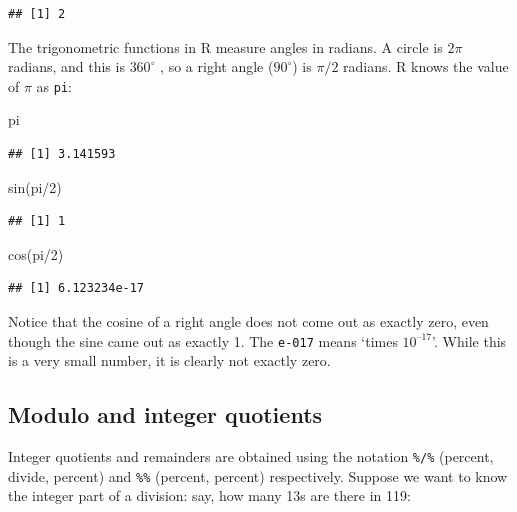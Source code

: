 \documentclass[
]{book}
\newenvironment{Shaded}{\begin{snugshade}}{\end{snugshade}}
\newcommand{\DecValTok}[1]{\textcolor[rgb]{0.00,0.00,0.81}{#1}}
\newcommand{\FunctionTok}[1]{\textcolor[rgb]{0.00,0.00,0.00}{#1}}
\newcommand{\NormalTok}[1]{#1}
\newcommand{\SpecialCharTok}[1]{\textcolor[rgb]{0.00,0.00,0.00}{#1}}
\begin{document}
\begin{verbatim}
## [1] 2
\end{verbatim}

The trigonometric functions in R measure angles in radians. A circle is \(2\pi\) radians, and this is \(360^\circ\) , so a right angle (\(90^\circ\)) is \(\pi / 2\) radians. R knows the value of \(\pi\) as \texttt{pi}:

\begin{Shaded}
\begin{Highlighting}[]
\NormalTok{pi}
\end{Highlighting}
\end{Shaded}

\begin{verbatim}
## [1] 3.141593
\end{verbatim}

\begin{Shaded}
\begin{Highlighting}[]
\FunctionTok{sin}\NormalTok{(pi}\SpecialCharTok{/}\DecValTok{2}\NormalTok{)}
\end{Highlighting}
\end{Shaded}

\begin{verbatim}
## [1] 1
\end{verbatim}

\begin{Shaded}
\begin{Highlighting}[]
\FunctionTok{cos}\NormalTok{(pi}\SpecialCharTok{/}\DecValTok{2}\NormalTok{)}
\end{Highlighting}
\end{Shaded}

\begin{verbatim}
## [1] 6.123234e-17
\end{verbatim}

Notice that the cosine of a right angle does not come out as exactly zero, even though the sine came out as exactly 1. The \texttt{e-017} means `times \(10^{–17}\)'. While this is a very small number, it is clearly not exactly zero.

\hypertarget{modulo-and-integer-quotients}{%
\subsection{Modulo and integer quotients}\label{modulo-and-integer-quotients}}

Integer quotients and remainders are obtained using the notation \texttt{\%/\%} (percent, divide, percent) and \texttt{\%\%} (percent, percent) respectively. Suppose we want to know the integer part of a division: say, how many 13s are there in 119:
\end{document}
